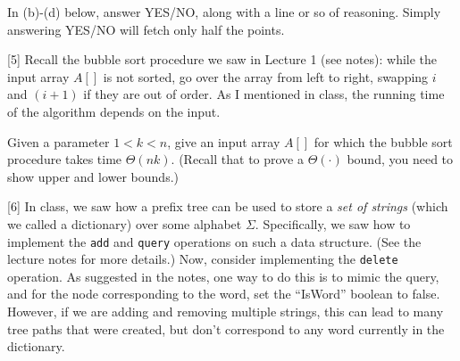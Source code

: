\documentclass[addpoints, 11pt]{exam}
\begin{document}
\begin{questions}
In (b)-(d) below, answer YES/NO, along with a line or so of reasoning. Simply answering YES/NO will fetch only half the points.

[5]
Recall the bubble sort procedure we saw in Lecture 1 (see notes): while the input array $A[]$ is not sorted, go over the array from left to right, swapping $i$ and $(i+1)$ if they are out of order. As I mentioned in class, the running time of the algorithm depends on the input. 

Given a parameter $1< k < n$, give an input array $A[]$ for which the bubble sort procedure takes time $\Theta(nk)$.  (Recall that to prove a $\Theta(\cdot)$ bound, you need to show upper and lower bounds.)

[6]
In class, we saw how a prefix tree can be used to store a {\em set of strings} (which we called a dictionary) over some alphabet $\Sigma$. Specifically, we saw how to implement the \texttt{add} and \texttt{query} operations on such a data structure. (See the lecture notes for more details.) Now, consider implementing the \texttt{delete} operation. As suggested in the notes, one way to do this is to mimic the 
query, and for the node corresponding to the word, set the ``IsWord'' boolean to false. However, if we are adding and removing multiple strings, this can lead to many tree paths that were created, but don't correspond to any word currently in the dictionary.


\end{questions}
\end{document}
